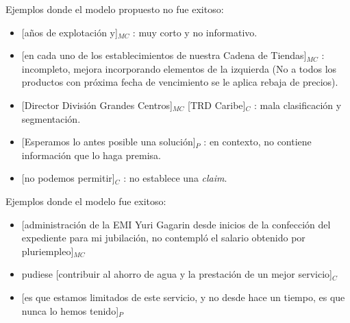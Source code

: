 \documentclass[a4paper,11pt,twocolumn,twoside]{article}
\begin{document}
Ejemplos donde el modelo propuesto no fue exitoso:
\begin{itemize}
	\item \text{} [años de explotación y]$_{MC}$
	      : muy corto y no informativo. %
	\item \text{} [en cada uno de los establecimientos de nuestra Cadena de Tiendas]$_{MC}$
	      : incompleto, mejora incorporando elementos de la izquierda (No a todos los productos con próxima fecha de vencimiento se le aplica rebaja de precios). %
	\item \text{} [Director División Grandes Centros]$_{MC}$ [TRD Caribe]$_{C}$
	      : mala clasificación y segmentación. %
	\item \text{} [Esperamos lo antes posible una solución]$_{P}$
	      : en contexto, no contiene información que lo haga premisa. %
	\item \text{} [no podemos permitir]$_{C}$
	      : no establece una \textit{claim}. %
\end{itemize}

Ejemplos donde el modelo fue exitoso:
\begin{itemize}
	\item \text{} [administración de la EMI Yuri Gagarin desde inicios de la confección del expediente para
		      mi jubilación, no contempló el salario obtenido por pluriempleo]$_{MC}$ %
	\item pudiese [contribuir al ahorro de agua y la prestación de un mejor servicio]$_C$ %
	\item \text{} [es que estamos limitados de este servicio, y no desde hace un tiempo, es que nunca lo hemos tenido]$_P$ %
\end{itemize}
\end{document}
